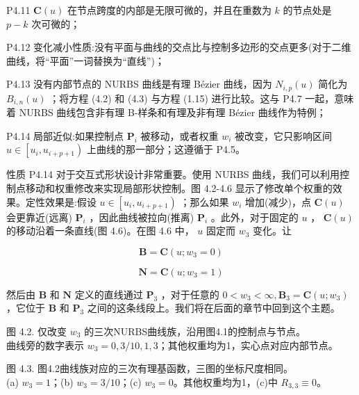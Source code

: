 \documentclass[../main.tex]{subfiles}
\begin{document}
P4.11 \(\mathbf{C}\left( u\right)\) 在节点跨度的内部是无限可微的，并且在重数为 \(k\) 的节点处是 \(p - k\) 次可微的；

P4.12 变化减小性质:没有平面与曲线的交点比与控制多边形的交点更多(对于二维曲线，将“平面”一词替换为“直线”)；

P4.13 没有内部节点的 NURBS 曲线是有理 Bézier 曲线，因为 \({N}_{i,p}\left( u\right)\) 简化为 \({B}_{i,n}\left( u\right)\) ；将方程 (4.2) 和 (4.3) 与方程 (1.15) 进行比较。这与 P4.7 一起，意味着 NURBS 曲线包含非有理 B-样条和有理及非有理 Bézier 曲线作为特例；

P4.14 局部近似:如果控制点 \({\mathbf{P}}_{i}\) 被移动，或者权重 \({w}_{i}\) 被改变，它只影响区间 \(u \in  \left\lbrack  {{u}_{i},{u}_{i + p + 1}}\right)\) 上曲线的那一部分；这遵循于 P4.5。

性质 P4.14 对于交互式形状设计非常重要。使用 NURBS 曲线，我们可以利用控制点移动和权重修改来实现局部形状控制。图 4.2-4.6 显示了修改单个权重的效果。定性效果是:假设 \(u \in  \left\lbrack  {{u}_{i},{u}_{i + p + 1}}\right)\) ；那么如果 \({w}_{i}\) 增加(减少)，点 \(\mathbf{C}\left( u\right)\) 会更靠近(远离) \({\mathbf{P}}_{i}\) ，因此曲线被拉向(推离) \({\mathbf{P}}_{i}\) 。此外，对于固定的 \(u\) ， \(\mathbf{C}\left( u\right)\) 的移动沿着一条直线(图 4.6)。在图 4.6 中， \(u\) 固定而 \({w}_{3}\) 变化。让

\[
\mathbf{B} = \mathbf{C}\left( {u;{w}_{3} = 0}\right)  \tag{4.4}
\]

\[
\mathbf{N} = \mathbf{C}\left( {u;{w}_{3} = 1}\right)
\]

然后由 \(\mathbf{B}\) 和 \(\mathbf{N}\) 定义的直线通过 \({\mathbf{P}}_{3}\) ，对于任意的 \(0 < {w}_{3} < \infty ,{\mathbf{B}}_{3} = \mathbf{C}\left( {u;{w}_{3}}\right)\) ，它位于 \(\mathbf{B}\) 和 \({\mathbf{P}}_{3}\) 之间的这条线段上。我们将在后面的章节中回到这个主题。

\begin{center}
\begin{minipage}{18cm}
\vspace*{.6\baselineskip}
\centering
{}
\par\smallskip
图 4.2. 仅改变 \(w_3\) 的三次NURBS曲线族，沿用图4.1的控制点与节点。\\ 曲线旁的数字表示 \(w_3=0,3/10,1,3\)；其他权重均为1，实心点对应内部节点。
\end{minipage}
\end{center}

\begin{center}
\begin{minipage}{18cm}
\vspace*{.6\baselineskip}
\centering
{}
\par\smallskip
图 4.3. 图4.2曲线族对应的三次有理基函数，三图的坐标尺度相同。\\ (a) \(w_3=1\)；(b) \(w_3=3/10\)；(c) \(w_3=0\)。其他权重均为1，(c)中 \(R_{3,3}\equiv0\)。
\end{minipage}
\end{center}
\end{document}
